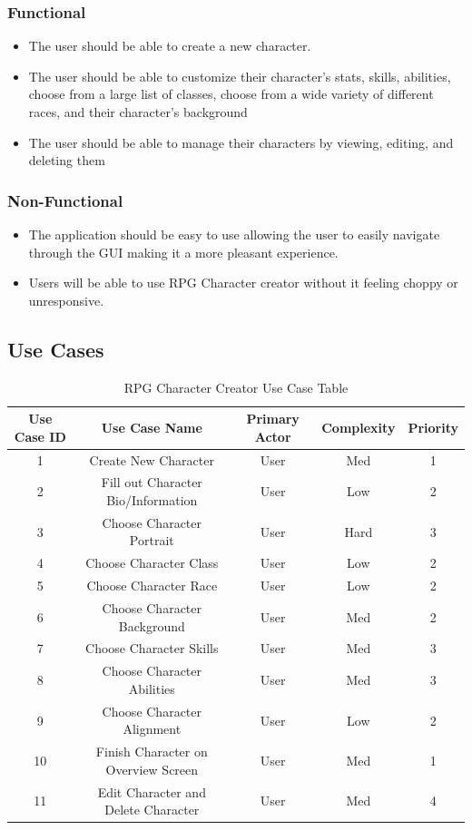 \documentclass[10pt,conference,onecolumn,compsoc]{IEEEtran}
\begin{document}
\subsubsection{Functional}
\begin{itemize}
\item The user should be able to create a new character.
\item The user should be able to customize their character's stats, skills, abilities, choose from a large list of classes, choose from a wide variety of different races, and their character's background
\item The user should be able to manage their characters by viewing, editing, and deleting them
\end{itemize}

\subsubsection{Non-Functional}
\begin{itemize}
\item The application should be easy to use allowing the user to easily navigate through the GUI making it a more pleasant experience.
\item Users will be able to use RPG Character creator without it feeling choppy or unresponsive.
\end{itemize}

\subsection{Use Cases}
\begin{table}
\centering
\begin{tabular}{|c|c|c|c|c|}
\hline
Use Case ID & Use Case Name & Primary Actor & Complexity & Priority \\
\hline \hline
1 &  Create New Character & User & Med & 1\\
\hline
2 & Fill out Character Bio/Information & User & Low & 2\\
\hline
3 & Choose Character Portrait & User & Hard & 3\\
\hline
4 & Choose Character Class & User & Low & 2\\
\hline
5 & Choose Character Race & User & Low & 2\\
\hline
6 & Choose Character Background & User & Med & 2\\
\hline
7 & Choose Character Skills & User & Med & 3\\
\hline
8 & Choose Character Abilities & User & Med & 3\\
\hline
9 & Choose Character Alignment & User & Low & 2\\
\hline
10 & Finish Character on Overview Screen & User & Med & 1\\
\hline
11 & Edit Character and Delete Character & User & Med & 4\\



\end{tabular}
\caption{RPG Character Creator Use Case Table}
\label{tab:useCaseIndex}
\end{table}
\end{document}
